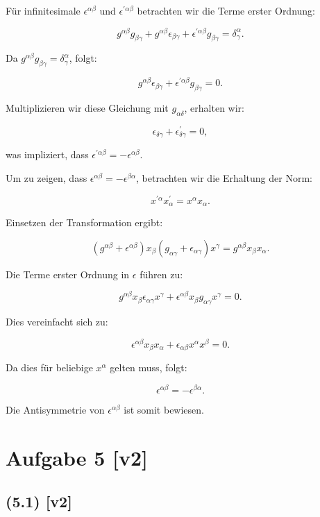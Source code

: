 \documentclass[11pt,a4paper]{article}
\begin{document}
Für infinitesimale $\epsilon^{\alpha \beta}$ und $\epsilon^{\prime \alpha \beta}$ betrachten wir die Terme erster Ordnung:

\[
g^{\alpha \beta} g_{\beta \gamma} + g^{\alpha \beta} \epsilon_{\beta \gamma} + \epsilon^{\prime \alpha \beta} g_{\beta \gamma} = \delta^\alpha_\gamma.
\]

Da $g^{\alpha \beta} g_{\beta \gamma} = \delta^\alpha_\gamma$, folgt:

\[
g^{\alpha \beta} \epsilon_{\beta \gamma} + \epsilon^{\prime \alpha \beta} g_{\beta \gamma} = 0.
\]

Multiplizieren wir diese Gleichung mit $g_{\alpha \delta}$, erhalten wir:

\[
\epsilon_{\delta \gamma} + \epsilon^{\prime}_{\delta \gamma} = 0,
\]

was impliziert, dass $\epsilon^{\prime \alpha \beta} = - \epsilon^{\alpha \beta}$.

Um zu zeigen, dass $\epsilon^{\alpha \beta} = -\epsilon^{\beta \alpha}$, betrachten wir die Erhaltung der Norm:

\[
x^{\prime \alpha} x^{\prime}_\alpha = x^\alpha x_\alpha.
\]

Einsetzen der Transformation ergibt:

\[
\left(g^{\alpha \beta} + \epsilon^{\alpha \beta}\right) x_\beta \left(g_{\alpha \gamma} + \epsilon_{\alpha \gamma}\right) x^\gamma = g^{\alpha \beta} x_\beta x_\alpha.
\]

Die Terme erster Ordnung in $\epsilon$ führen zu:

\[
g^{\alpha \beta} x_\beta \epsilon_{\alpha \gamma} x^\gamma + \epsilon^{\alpha \beta} x_\beta g_{\alpha \gamma} x^\gamma = 0.
\]

Dies vereinfacht sich zu:

\[
\epsilon^{\alpha \beta} x_\beta x_\alpha + \epsilon_{\alpha \beta} x^\alpha x^\beta = 0.
\]

Da dies für beliebige $x^\alpha$ gelten muss, folgt:

\[
\epsilon^{\alpha \beta} = -\epsilon^{\beta \alpha}.
\]

Die Antisymmetrie von $\epsilon^{\alpha \beta}$ ist somit bewiesen.

\section*{Aufgabe 5 [v2]}
\subsection*{(5.1) [v2]}
\end{document}
